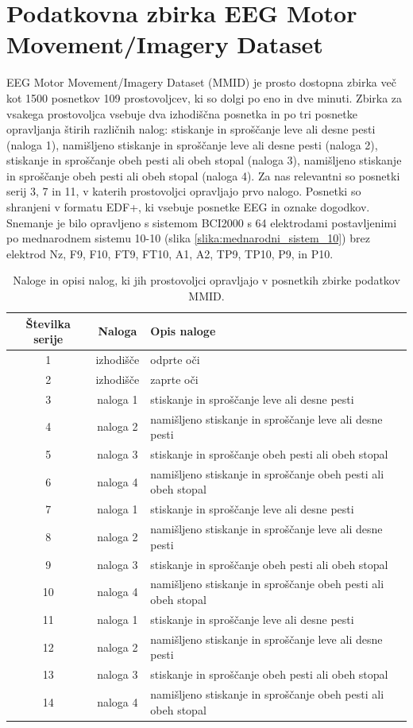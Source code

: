 \section{Podatkovna zbirka EEG Motor Movement/Imagery Dataset}
EEG Motor Movement/Imagery Dataset (MMID) je prosto dostopna zbirka več kot 1500 posnetkov 109 prostovoljcev, ki so dolgi po eno in dve minuti. Zbirka za vsakega prostovoljca vsebuje dva izhodiščna posnetka in po tri posnetke opravljanja štirih različnih nalog: stiskanje in sproščanje leve ali desne pesti (naloga 1), namišljeno stiskanje in sproščanje leve ali desne pesti (naloga 2), stiskanje in sproščanje obeh pesti ali obeh stopal (naloga 3), namišljeno stiskanje in sproščanje obeh pesti ali obeh stopal (naloga 4). Za nas relevantni so posnetki serij 3, 7 in 11, v katerih prostovoljci opravljajo prvo nalogo. Posnetki so shranjeni v formatu EDF+, ki vsebuje posnetke EEG in oznake dogodkov. Snemanje je bilo opravljeno s sistemom BCI2000 s 64 elektrodami postavljenimi po mednarodnem sistemu 10-10 (slika \ref{slika:mednarodni_sistem_10}) brez elektrod Nz, F9, F10, FT9, FT10, A1, A2, TP9, TP10, P9, in P10. \cite{schalkBCI2000GeneralpurposeBraincomputer2004,schalkEEGMotorMovement2009}

\begin{table}[h]
\centering
\begin{tabular}{|c|c|l|}

\hline
Številka serije & Naloga &Opis naloge \\
\hline
1 & izhodišče & odprte oči  \\
\hline
2 & izhodišče & zaprte oči  \\
\hline
3 & naloga 1 & stiskanje in sproščanje leve ali desne pesti \\
\hline
4 & naloga 2 &namišljeno stiskanje in sproščanje leve ali desne pesti  \\
\hline
5 & naloga 3 &stiskanje in sproščanje obeh pesti ali obeh stopal \\
\hline
6 & naloga 4 &namišljeno stiskanje in sproščanje obeh pesti ali obeh stopal  \\
\hline
7 & naloga 1 &stiskanje in sproščanje leve ali desne pesti \\
\hline
8 & naloga 2 &namišljeno stiskanje in sproščanje leve ali desne pesti  \\
\hline
9 & naloga 3 &stiskanje in sproščanje obeh pesti ali obeh stopal \\
\hline
10 & naloga 4 &namišljeno stiskanje in sproščanje obeh pesti ali obeh stopal  \\
\hline
11 & naloga 1 &stiskanje in sproščanje leve ali desne pesti \\
\hline
12 &naloga 2 &namišljeno stiskanje in sproščanje leve ali desne pesti  \\
\hline
13 & naloga 3 &stiskanje in sproščanje obeh pesti ali obeh stopal \\
\hline
14 & naloga 4 &namišljeno stiskanje in sproščanje obeh pesti ali obeh stopal  \\

\hline
\end{tabular}
\caption{Naloge in opisi nalog, ki jih prostovoljci opravljajo v posnetkih zbirke podatkov MMID.}
\end{table}


